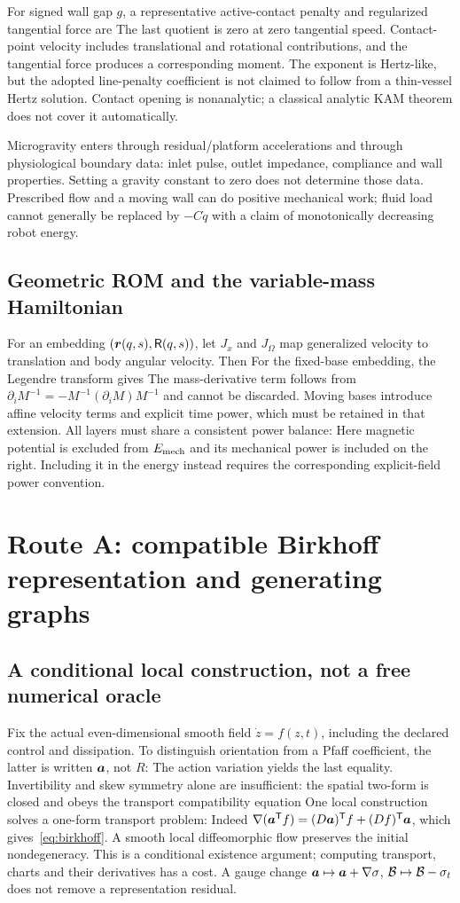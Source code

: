 For signed wall gap $g$, a representative active-contact penalty and regularized tangential force are
\EqContact
The last quotient is zero at zero tangential speed. Contact-point velocity includes translational and rotational contributions, and the tangential force produces a corresponding moment. The exponent is Hertz-like, but the adopted line-penalty coefficient is not claimed to follow from a thin-vessel Hertz solution. Contact opening is nonanalytic; a classical analytic KAM theorem does not cover it automatically.

Microgravity enters through residual/platform accelerations and through physiological boundary data: inlet pulse, outlet impedance, compliance and wall properties. Setting a gravity constant to zero does not determine those data. Prescribed flow and a moving wall can do positive mechanical work; fluid load cannot generally be replaced by $-C\dot q$ with a claim of monotonically decreasing robot energy.

\subsection{Geometric ROM and the variable-mass Hamiltonian}
For an embedding $(\bm r(q,s),\mathsf R(q,s))$, let $J_x$ and $J_\Omega$ map generalized velocity to translation and body angular velocity. Then
\EqMass
For the fixed-base embedding, the Legendre transform gives
\EqHamiltonian
The mass-derivative term follows from $\partial_iM^{-1}=-M^{-1}(\partial_iM)M^{-1}$ and cannot be discarded. Moving bases introduce affine velocity terms and explicit time power, which must be retained in that extension. All layers must share a consistent power balance:
\EqPower
Here magnetic potential is excluded from $E_{\rm mech}$ and its mechanical power is included on the right. Including it in the energy instead requires the corresponding explicit-field power convention.

\PaperPage
\section{Route A: compatible Birkhoff representation and generating graphs}
\subsection{A conditional local construction, not a free numerical oracle}
Fix the actual even-dimensional smooth field $\dot z=f(z,t)$, including the declared control and dissipation. To distinguish orientation from a Pfaff coefficient, the latter is written $\bm a$, not $R$:
\EqBirkhoff
The action variation yields the last equality. Invertibility and skew symmetry alone are insufficient: the spatial two-form is closed and obeys the transport compatibility equation
\EqCompatibility
One local construction solves a one-form transport problem:
\EqTransport
Indeed $\nabla(\bm a^{\mathsf T} f)=(D\bm a)^{\mathsf T} f+(Df)^{\mathsf T}\bm a$, which gives~\eqref{eq:birkhoff}. A smooth local diffeomorphic flow preserves the initial nondegeneracy. This is a conditional existence argument; computing transport, charts and their derivatives has a cost. A gauge change $\bm a\mapsto\bm a+\nabla\sigma$, $\mathcal B\mapsto\mathcal B-\sigma_t$ does not remove a representation residual.

